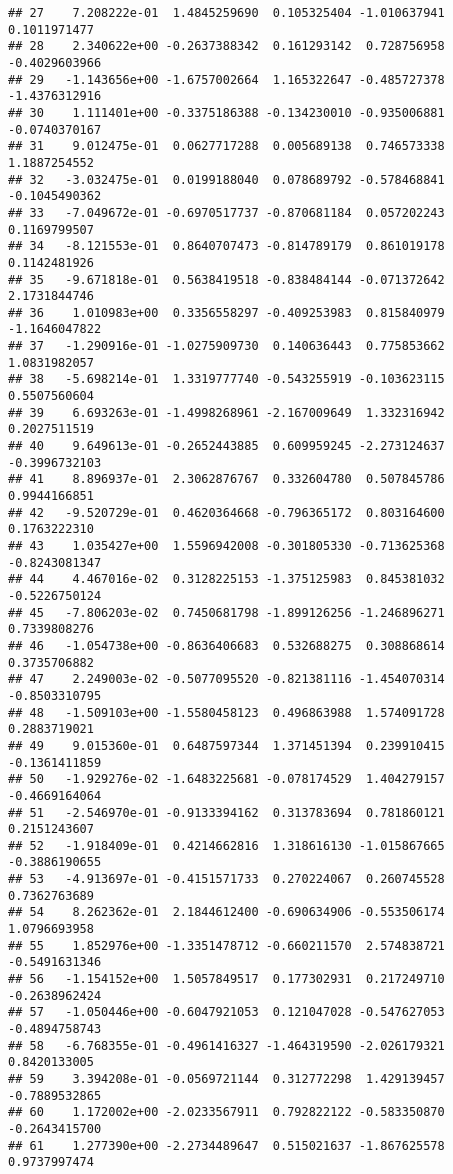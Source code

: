\documentclass[
]{article}
\begin{document}
\begin{verbatim}
## 27    7.208222e-01  1.4845259690  0.105325404 -1.010637941  0.1011971477
## 28    2.340622e+00 -0.2637388342  0.161293142  0.728756958 -0.4029603966
## 29   -1.143656e+00 -1.6757002664  1.165322647 -0.485727378 -1.4376312916
## 30    1.111401e+00 -0.3375186388 -0.134230010 -0.935006881 -0.0740370167
## 31    9.012475e-01  0.0627717288  0.005689138  0.746573338  1.1887254552
## 32   -3.032475e-01  0.0199188040  0.078689792 -0.578468841 -0.1045490362
## 33   -7.049672e-01 -0.6970517737 -0.870681184  0.057202243  0.1169799507
## 34   -8.121553e-01  0.8640707473 -0.814789179  0.861019178  0.1142481926
## 35   -9.671818e-01  0.5638419518 -0.838484144 -0.071372642  2.1731844746
## 36    1.010983e+00  0.3356558297 -0.409253983  0.815840979 -1.1646047822
## 37   -1.290916e-01 -1.0275909730  0.140636443  0.775853662  1.0831982057
## 38   -5.698214e-01  1.3319777740 -0.543255919 -0.103623115  0.5507560604
## 39    6.693263e-01 -1.4998268961 -2.167009649  1.332316942  0.2027511519
## 40    9.649613e-01 -0.2652443885  0.609959245 -2.273124637 -0.3996732103
## 41    8.896937e-01  2.3062876767  0.332604780  0.507845786  0.9944166851
## 42   -9.520729e-01  0.4620364668 -0.796365172  0.803164600  0.1763222310
## 43    1.035427e+00  1.5596942008 -0.301805330 -0.713625368 -0.8243081347
## 44    4.467016e-02  0.3128225153 -1.375125983  0.845381032 -0.5226750124
## 45   -7.806203e-02  0.7450681798 -1.899126256 -1.246896271  0.7339808276
## 46   -1.054738e+00 -0.8636406683  0.532688275  0.308868614  0.3735706882
## 47    2.249003e-02 -0.5077095520 -0.821381116 -1.454070314 -0.8503310795
## 48   -1.509103e+00 -1.5580458123  0.496863988  1.574091728  0.2883719021
## 49    9.015360e-01  0.6487597344  1.371451394  0.239910415 -0.1361411859
## 50   -1.929276e-02 -1.6483225681 -0.078174529  1.404279157 -0.4669164064
## 51   -2.546970e-01 -0.9133394162  0.313783694  0.781860121  0.2151243607
## 52   -1.918409e-01  0.4214662816  1.318616130 -1.015867665 -0.3886190655
## 53   -4.913697e-01 -0.4151571733  0.270224067  0.260745528  0.7362763689
## 54    8.262362e-01  2.1844612400 -0.690634906 -0.553506174  1.0796693958
## 55    1.852976e+00 -1.3351478712 -0.660211570  2.574838721 -0.5491631346
## 56   -1.154152e+00  1.5057849517  0.177302931  0.217249710 -0.2638962424
## 57   -1.050446e+00 -0.6047921053  0.121047028 -0.547627053 -0.4894758743
## 58   -6.768355e-01 -0.4961416327 -1.464319590 -2.026179321  0.8420133005
## 59    3.394208e-01 -0.0569721144  0.312772298  1.429139457 -0.7889532865
## 60    1.172002e+00 -2.0233567911  0.792822122 -0.583350870 -0.2643415700
## 61    1.277390e+00 -2.2734489647  0.515021637 -1.867625578  0.9737997474

\end{verbatim}
\end{document}
